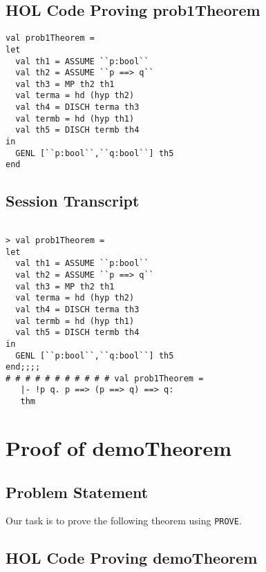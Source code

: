 \documentclass{report}
\begin{document}
\section{HOL Code Proving prob1Theorem}
\label{sec:hol-code-proving}


\begin{lstlisting}[frame=trBL]
val prob1Theorem =
let
  val th1 = ASSUME ``p:bool``
  val th2 = ASSUME ``p ==> q``
  val th3 = MP th2 th1
  val terma = hd (hyp th2)
  val th4 = DISCH terma th3
  val termb = hd (hyp th1)
  val th5 = DISCH termb th4
in
  GENL [``p:bool``,``q:bool``] th5
end  
\end{lstlisting}

\section{Session Transcript}
\label{sec:session-transcript}

\setcounter{sessioncount}{0}
\begin{session}
  \begin{scriptsize}
\begin{verbatim}

> val prob1Theorem =
let
  val th1 = ASSUME ``p:bool``
  val th2 = ASSUME ``p ==> q``
  val th3 = MP th2 th1
  val terma = hd (hyp th2)
  val th4 = DISCH terma th3
  val termb = hd (hyp th1)
  val th5 = DISCH termb th4
in
  GENL [``p:bool``,``q:bool``] th5
end;;;;
# # # # # # # # # # # val prob1Theorem =
   |- !p q. p ==> (p ==> q) ==> q:
   thm
\end{verbatim}
  \end{scriptsize}
\end{session}

\chapter{Proof of demoTheorem}
\label{cha:proof-demotheorem}

\section{Problem Statement}
\label{sec:problem-statement-1}

Our task is to prove the following theorem using \texttt{PROVE}.
\HOLexampleOneTheoremsdemoTheorem




\section{HOL Code Proving demoTheorem}
\label{sec:hol-code-proving-1}
\end{document}
